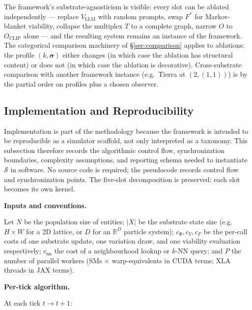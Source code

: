 \documentclass[journal]{IEEEtran}
\theoremstyle{plain}
\theoremstyle{definition}
\theoremstyle{plain}
\newcounter{topic}[subsection]
\newcommand{\topic}[1]{%
  \refstepcounter{topic}%
  \par\smallskip\noindent\textbf{#1.}\ }
\newcommand{\R}{\mathbb{R}}
\begin{document}
\medskip

The framework's substrate-agnosticism is visible: every slot can be
ablated independently --- replace $V_{\mathrm{LLM}}$ with random prompts,
swap $F^{*}$ for Markov-blanket viability, collapse the multiplex $T$
to a complete graph, narrow $O$ to $O_{\mathrm{CLIP}}$ alone --- and the
resulting system remains an instance of the framework. The categorical
comparison machinery of \S\ref{sec:comparison} applies to ablations: the
profile $(k, \boldsymbol{\sigma})$ either changes (in which case the
ablation has structural content) or does not (in which case the
ablation is decorative). Cross-substrate comparison with another
framework instance (e.g.\ Tierra at $(2, (1, 1))$) is by the partial
order on profiles plus a chosen observer.

\subsection{Implementation and Reproducibility}\label{sec:parallel}

Implementation is part of the methodology because the framework is intended
to be reproducible as a simulator scaffold, not only interpreted as a
taxonomy. This subsection therefore records the algorithmic control flow,
synchronization boundaries, complexity assumptions, and reporting schema
needed to instantiate $\mathcal{S}$ in software. No source code is required;
the pseudocode records control flow and synchronization points. The five-slot
decomposition is preserved: each slot becomes its own kernel.

\topic{Inputs and conventions}

Let $N$ be the population size of entities; $|X|$ be the substrate state
size (e.g.\ $H\times W$ for a 2D lattice, or $D$ for an $\R^D$ particle
system); $c_\Phi, c_V, c_F$ be the per-call costs of one substrate update,
one variation draw, and one viability evaluation respectively;
$c_{\mathrm{nn}}$ the cost of a neighbourhood lookup or $k$-NN query; and
$P$ the number of parallel workers (SMs $\times$ warp-equivalents in CUDA
terms; XLA threads in JAX terms).

\topic{Per-tick algorithm}

At each tick $t \to t+1$:
\end{document}
